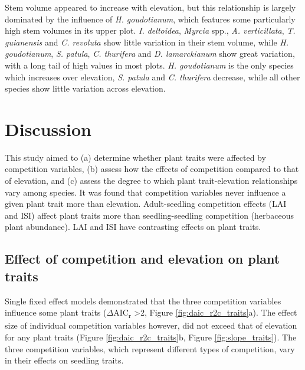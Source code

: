\documentclass[a4paper,10pt,]{report}
\begin{document}
Stem volume appeared to  increase with elevation, but this relationship is largely dominated by the influence of \textit{H. goudotianum}, which features some particularly high stem volumes in its upper plot. \textit{I. deltoidea}, \textit{Myrcia} spp., \textit{A. verticillata}, \textit{T. guianensis} and \textit{C. revoluta} show little variation in their stem volume, while \textit{H. goudotianum}, \textit{S. patula}, \textit{C. thurifera} and \textit{D. lamarckianum} show great variation, with a long tail of high values in most plots. \textit{H. goudotianum} is the only species which increases over elevation, \textit{S. patula} and \textit{C. thurifera} decrease, while all other species show little variation across elevation.



\chapter{Discussion}
This study aimed to (a) determine whether plant traits were affected by competition variables, (b) assess how the effects of competition compared to that of elevation, and (c) assess the degree to which plant trait-elevation relationships vary among species. It was found that competition variables never influence a given plant trait more than elevation. Adult-seedling competition effects (LAI and ISI) affect plant traits more than seedling-seedling competition (herbaceous plant abundance). LAI and ISI have contrasting effects on plant traits. 

\section{Effect of competition and elevation on plant traits}
Single fixed effect models demonstrated that the three competition variables influence some plant traits ($\Delta$AIC\textsubscript{r} >2, Figure \ref{fig:daic_r2c_traits}a). The effect size of individual competition variables however, did not exceed that of elevation for any plant traits (Figure \ref{fig:daic_r2c_traits}b, Figure \ref{fig:slope_traits}).  The three competition variables, which represent different types of competition, vary in their effects on seedling traits.
\end{document}
